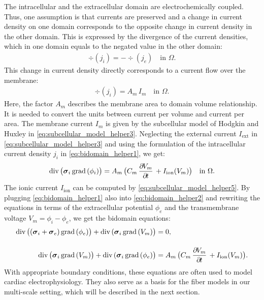 The intracellular and the extracellular domain are electrochemically coupled. Thus, one assumption is that currents are preserved and a change in current density on one domain corresponds to the opposite change in current density in the other domain. This is expressed by the divergence of the current densities, which in one domain equals to the negated value in the other domain:
%
\begin{align}\label{eq:bidomain_helper2}
  \div(j_i) = -\div(j_e) \quad \text{in }\Omega.
\end{align}
%
This change in current density directly corresponds to a current flow over the membrane:%
%
\begin{align*}
  \div(j_i) = A_m\,I_m \quad \text{in }\Omega.
\end{align*}
%
Here, the factor $A_m$ describes the membrane area to domain volume relationship. It is needed to convert the units between current per volume and current per area. The membrane current $I_m$ is given by the subcellular model of Hodgkin and Huxley in \cref{eq:subcellular_model_helper3}. Neglecting the external current $I_\text{ext}$ in \cref{eq:subcellular_model_helper3} and using the formulation of the intracellular current density $j_i$ in \cref{eq:bidomain_helper1}, we get:
%
\begin{align*}
  \div\big(\bfsigma_i\,\grad(\phi_i)\big) = A_m\,\big(C_m\,\p{V_m}{t} + I_\text{ion}(V_m)\big) \quad \text{in }\Omega.
\end{align*}
%
The ionic current $I_\text{ion}$ can be computed by \cref{eq:subcellular_model_helper5}. 
By plugging \cref{eq:bidomain_helper1} also into \cref{eq:bidomain_helper2} and rewriting the equations in terms of the extracellular potential $\phi_e$ and the transmembrane voltage $V_m = \phi_i-\phi_e$, we get the bidomain equations:%
\begin{subequations}
  \begin{align}
    \div\big((\bfsigma_i + \bfsigma_e)\,\grad(\phi_e)\big) + \div(\bfsigma_i\,\grad(V_m)\big) &= 0,\label{eq:bidomain1} \\[4mm]
    \div\big(\bfsigma_i\,\grad(V_m)\big) + \div(\bfsigma_i\,\grad(\phi_e)\big) &= A_m\,\big(C_m\,\p{V_m}{t} + I_\text{ion}(V_m)\big).  \label{eq:bidomain2}
  \end{align}
\end{subequations}
%
With appropriate boundary conditions, these equations are often used to model cardiac electrophysiology. They also serve as a basis for the fiber models in our multi-scale setting, which will be described in the next section.

